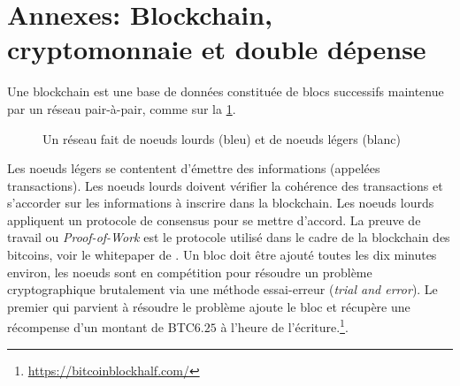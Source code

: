 \section{Annexes: Blockchain, cryptomonnaie et double dépense}\label{app:application_blockchain}

Une blockchain est une base de données constituée de blocs successifs maintenue par un réseau pair-à-pair, comme sur la \cref{fig:blockchain_network}. 
\begin{figure}[ht!]
\begin{center}
\end{center}
\caption{Un réseau fait de noeuds lourds (bleu) et de noeuds légers (blanc)}
\label{fig:blockchain_network}
\end{figure}
Les noeuds légers se contentent d'émettre des informations (appelées transactions). Les noeuds lourds doivent vérifier la cohérence des transactions et s'accorder sur les informations à inscrire dans la blockchain. Les noeuds lourds appliquent un protocole de consensus pour se mettre d'accord. La preuve de travail ou \textit{Proof-of-Work} est le protocole utilisé dans le cadre de la blockchain des bitcoins, voir le whitepaper de \citet{Nakamoto2008}. Un bloc doit être ajouté toutes les dix minutes environ, les noeuds sont en compétition pour résoudre un problème cryptographique brutalement via une méthode essai-erreur (\textit{trial and error}). Le premier qui parvient à résoudre le problème ajoute le bloc et récupère une récompense d'un montant de BTC$6.25$ à l'heure de l'écriture.\footnote{\url{https://bitcoinblockhalf.com/}}. \\

